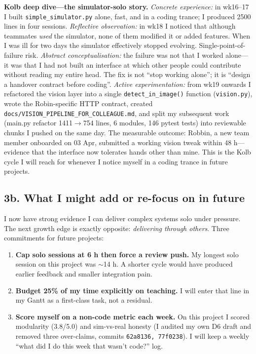 \www \textbf{Kolb deep dive---the simulator-solo story.}
\emph{Concrete experience:} in wk16--17 I built \texttt{simple\_simulator.py} alone, fast, and in a coding trance; I produced 2500 lines in four sessions. \emph{Reflective observation:} in wk18 I noticed that although teammates \emph{used} the simulator, none of them modified it or added features. When I was ill for two days the simulator effectively stopped evolving. Single-point-of-failure risk. \emph{Abstract conceptualisation:} the failure was not that I worked alone---it was that I had not built an interface at which other people could contribute without reading my entire head. The fix is not ``stop working alone''; it is ``design a handover contract before coding''. \emph{Active experimentation:} from wk19 onwards I refactored the vision layer into a single \texttt{detect\_in\_image()} function (\texttt{vision.py}), wrote the Robin-specific HTTP contract, created \texttt{docs/VISION\_PIPELINE\_FOR\_COLLEAGUE.md}, and split my subsequent work (main.py refactor 1411$\to$754 lines, 6 modules, 146 pytest tests) into reviewable chunks I pushed on the same day. The measurable outcome: Robbin, a new team member onboarded on 03 Apr, submitted a working vision tweak within 48 h---evidence that the interface now tolerates hands other than mine. This is the Kolb cycle I will reach for whenever I notice myself in a coding trance in future projects.

\subsection*{3b. What I might add or re-focus on in future }
\www I now have strong evidence I can deliver complex systems solo under pressure. \ebi The next growth edge is exactly opposite: \emph{delivering through others}. Three commitments for future projects:
\begin{enumerate}
\item \textbf{Cap solo sessions at 6 h then force a review push.} My longest solo session on this project was $\sim$14 h. A shorter cycle would have produced earlier feedback and smaller integration pain.
\item \textbf{Budget 25\% of my time explicitly on teaching.} I will enter that line in my Gantt as a first-class task, not a residual.
\item \textbf{Score myself on a non-code metric each week.} On this project I scored modularity (3.8/5.0) and sim-vs-real honesty (I audited my own D6 draft and removed three over-claims, commits \texttt{62a8136, 77f0238}). I will keep a weekly ``what did I do this week that wasn't code?'' log.
\end{enumerate}

